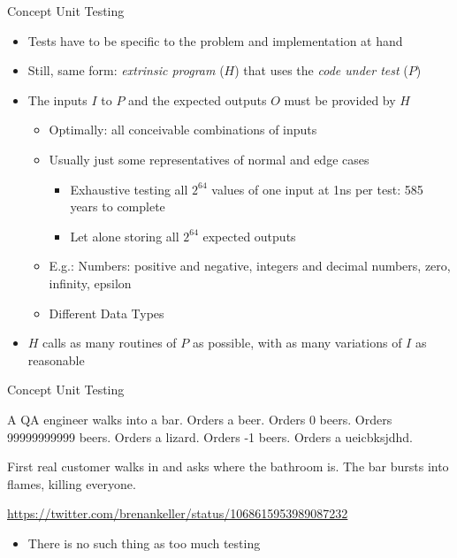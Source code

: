 \begin{frame}{Concept Unit Testing}
%
\begin{itemize}
\item Tests have to be specific to the problem and implementation at hand
\item Still, same form: \emph{extrinsic program} ($H$) that uses the \emph{code under test} ($P$)
\item The inputs $I$ to $P$ and the expected outputs $O$ must be provided by $H$
	\begin{itemize}
	\item Optimally: all conceivable combinations of inputs
	\item Usually just some representatives of normal and edge cases
		\begin{itemize}
		\item Exhaustive testing all $2^{64}$ values of one  input at 1\;ns per test: 585 years to complete
		\item Let alone storing all $2^{64}$ expected outputs
		\end{itemize}
	\item E.\;g.: Numbers: positive and negative, integers and decimal numbers, zero, infinity, epsilon
	\item Different Data Types
	\end{itemize}
\item[\Thus] $H$ calls as many routines of $P$ as possible, with as many variations of $I$ as reasonable
\end{itemize}
%
\end{frame}


\begin{frame}{Concept Unit Testing}
%
\begin{defbox}
\small
A QA engineer walks into a bar. Orders a beer. Orders 0 beers. Orders 99999999999 beers. Orders a lizard. Orders -1 beers. Orders a ueicbksjdhd. 

\vspace{6pt}
First real customer walks in and asks where the bathroom is. The bar bursts into flames, killing everyone.
\begin{flushright}
\tiny
\url{https://twitter.com/brenankeller/status/1068615953989087232}
\end{flushright}
\end{defbox}
%
\begin{itemize}
\item[\Thus] There is no such thing as too much testing
\end{itemize}
%
\end{frame}

